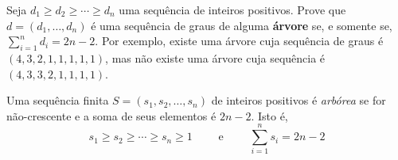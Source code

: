 Seja $d_1 \geq d_2 \geq \cdots \geq d_n$ uma sequência de inteiros positivos. Prove que $d = (d_1, \ldots, d_n)$ é uma sequência de graus de alguma \textbf{árvore} se, e somente se, $\sum_{i=1}^n d_i = 2n - 2$. Por exemplo, existe uma árvore cuja sequência de graus é $(4,3,2,1,1,1,1,1)$, mas não existe uma árvore cuja sequência é $(4,3,3,2,1,1,1,1)$.

\itemdsep

\begin{definition}
    \setlength{\belowdisplayskip}{0pt}
    Uma sequência finita $S = (s_1, s_2, \ldots, s_n)$ de inteiros positivos é \textit{arbórea} se for não-crescente e a soma de seus elementos é $2n - 2$. Isto é,
    \[
        s_1 \geq s_2 \geq \cdots \geq s_n \geq 1
        \qquad \text{ e } \qquad
        \sum_{i = 1}^n s_i = 2 n - 2
    \]
\end{definition}






